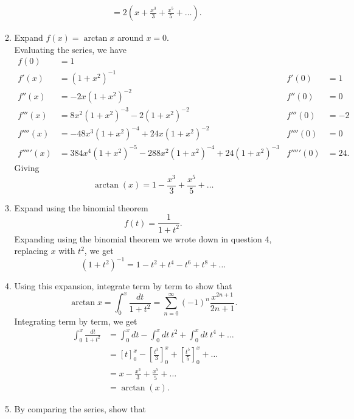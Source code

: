 \documentclass{article}
\begin{document}
\begin{enumerate}
\begin{enumerate}
{\begin{align*}
				&= 2\left( x + \frac{x^3}{3} + \frac{x^5}{5} + \ldots \right)  .
			\end{align*}
		}
		\item{Expand $f(x) = \arctan x$ around $x=0$. \\
		Evaluating the series, we have 
			\begin{align*}
				f(0) &= 1 \\
				f'(x) &= (1+x^2)^{-1} & f'(0) &= 1 \\
				f''(x) &= -2x(1+x^2)^{-2} & f''(0) &= 0 \\
				f'''(x) &= 8x^2 (1+x^2)^{-3} - 2(1+x^2)^{-2} & f'''(0) &= -2 \\
				f''''(x) &= -48x^3 (1+x^2)^{-4} + 24x (1+x^2)^{-2} & f''''(0) &= 0 \\
				f'''''(x) &= 384x^4 (1+x^2)^{-5} -288x^2 (1+x^2)^{-4} + 24 (1+x^2)^{-3} & f'''''(0) &= 24 .
			\end{align*}
			Giving 
			\begin{equation*}
				\arctan (x) = 1 - \frac{x^3}{3} + \frac{x^5}{5} + \ldots
			\end{equation*}
		}
		\item{Expand using the binomial theorem 
			\begin{equation*}
				f(t) = \frac{1}{1+t^2}.
			\end{equation*}
			Expanding using the binomial theorem we wrote down in question 4, replacing $x$ with $t^2$, we get
			\begin{equation*}
				(1+t^2)^{-1} = 1 - t^2 + t^4 - t^6 + t^8 + \ldots
			\end{equation*}
		}
		\item{Using this expansion, integrate term by term to show that 
			\begin{equation*}
				\arctan x = \int_0^x \frac{dt}{1+t^2} = \sum_{n=0}^\infty (-1)^n \frac{x^{2n + 1}}{2n + 1} .
			\end{equation*}
			Integrating term by term, we get
			\begin{align*}
				\int_0^x \frac{dt}{1+t^2} &= \int_0^x dt - \int_0^x dt \ t^2 + \int_0^x dt \ t^4 + \ldots \\
				&= \left[ t \right]_0^x - \left[ \frac{t^3}{3} \right]_0^x + \left[ \frac{t^5}{5} \right]_0^x + \ldots \\
				&= x - \frac{x^3}{3} + \frac{x^5}{5} + \ldots \\
				&= \arctan (x) .
			\end{align*}
		}
		\item{By comparing the series, show that 
}
\end{enumerate}
\end{enumerate}
\end{document}
